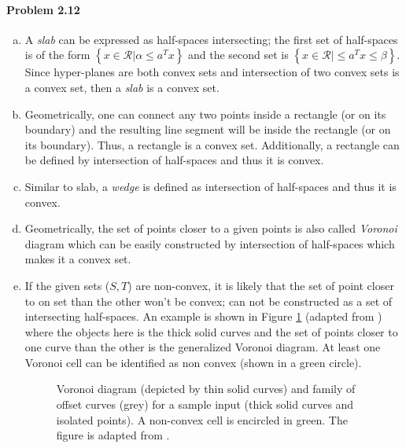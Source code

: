 \documentclass[12pt] {article}
\begin{document}
\paragraph{Problem 2.12} 
\begin{enumerate}[(a)]
\item A \emph{slab} can be expressed as half-spaces intersecting; the first set of half-spaces is of the form $\left\lbrace x \in \mathcal{R} | \alpha \leq a^{T} x \right\rbrace$ and the second set is $\left\lbrace x \in \mathcal{R} |  \leq a^{T} x \leq \beta \right\rbrace$. Since hyper-planes are both convex sets and intersection of two convex sets is a convex set, then a \emph{slab} is a convex set.

\item Geometrically, one can connect any two points inside a rectangle (or on its boundary) and the resulting line segment will be inside the rectangle (or on its boundary). Thus, a rectangle is a convex set. Additionally, a rectangle can be defined by intersection of half-spaces and thus it is convex.

\item Similar to slab, a \emph{wedge} is defined as intersection of half-spaces and thus it is convex. 

\item Geometrically, the set of points closer to a given points is also called \emph{Voronoi} diagram which can be easily constructed by intersection of half-spaces which makes it a convex set. 

\item If the given sets ($S, T$) are non-convex, it is likely that the set of point closer to on set than the other won't be convex; can not be constructed as a set of intersecting half-spaces. An example is shown in Figure \ref{fig:voro} (adapted from \citep{HELD2009327}) where the objects here is the thick solid curves and the set of points closer to one curve than the other is the generalized Voronoi diagram. At least one Voronoi cell can be identified as non convex (shown in a green circle). 
\begin{figure}[!tbh]
\centering        
   \caption{Voronoi diagram (depicted by thin solid curves) and family of offset curves (grey) for a sample input (thick solid curves and isolated points). A non-convex cell is encircled in green. The figure is adapted from \citep{HELD2009327}.}
   \label{fig:voro}
\end{figure}


\end{enumerate}
\end{document}
